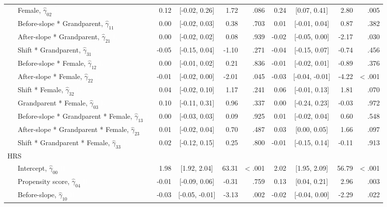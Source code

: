\documentclass[
  english,
  man,floatsintext]{apa7}
\newenvironment{lltable}{\begin{landscape}\begin{center}\begin{ThreePartTable}}{\end{ThreePartTable}\end{center}\end{landscape}}
\begin{document}
\begin{lltable}
{\begin{longtable}{lrcrrrcrr}
\ \ \ Female, $\hat{\gamma}_{02}$ \textcolor{white}{L} & 0.12 & {}[-0.02, 0.26] & 1.72 & .086 & 0.24 & {}[0.07, 0.41] & 2.80 & .005\\
\ \ \ Before-slope * Grandparent, $\hat{\gamma}_{11}$ \textcolor{white}{L} & 0.00 & {}[-0.02, 0.03] & 0.38 & .703 & 0.01 & {}[-0.01, 0.04] & 0.87 & .382\\
\ \ \ After-slope * Grandparent, $\hat{\gamma}_{21}$ \textcolor{white}{L} & 0.00 & {}[-0.02, 0.02] & 0.08 & .939 & -0.02 & {}[-0.05, 0.00] & -2.17 & .030\\
\ \ \ Shift * Grandparent, $\hat{\gamma}_{31}$ \textcolor{white}{L} & -0.05 & {}[-0.15, 0.04] & -1.10 & .271 & -0.04 & {}[-0.15, 0.07] & -0.74 & .456\\
\ \ \ Before-slope * Female, $\hat{\gamma}_{12}$ \textcolor{white}{L} & 0.00 & {}[-0.01, 0.02] & 0.21 & .836 & -0.01 & {}[-0.02, 0.01] & -0.89 & .376\\
\ \ \ After-slope * Female, $\hat{\gamma}_{22}$ \textcolor{white}{L} & -0.01 & {}[-0.02, 0.00] & -2.01 & .045 & -0.03 & {}[-0.04, -0.01] & -4.22 & < .001\\
\ \ \ Shift * Female, $\hat{\gamma}_{32}$ \textcolor{white}{L} & 0.04 & {}[-0.02, 0.10] & 1.17 & .241 & 0.06 & {}[-0.01, 0.13] & 1.81 & .070\\
\ \ \ Grandparent * Female, $\hat{\gamma}_{03}$ \textcolor{white}{L} & 0.10 & {}[-0.11, 0.31] & 0.96 & .337 & 0.00 & {}[-0.24, 0.23] & -0.03 & .972\\
\ \ \ Before-slope * Grandparent * Female, $\hat{\gamma}_{13}$ \textcolor{white}{L} & 0.00 & {}[-0.03, 0.03] & 0.09 & .925 & 0.01 & {}[-0.02, 0.04] & 0.60 & .548\\
\ \ \ After-slope * Grandparent * Female, $\hat{\gamma}_{23}$ \textcolor{white}{L} & 0.01 & {}[-0.02, 0.04] & 0.70 & .487 & 0.03 & {}[0.00, 0.05] & 1.66 & .097\\
\ \ \ Shift * Grandparent * Female, $\hat{\gamma}_{33}$ \textcolor{white}{L} & 0.02 & {}[-0.12, 0.15] & 0.25 & .800 & -0.01 & {}[-0.15, 0.14] & -0.11 & .913\\
HRS &  &  &  &  &  &  &  & \\
\ \ \ Intercept, $\hat{\gamma}_{00}$ \textcolor{white}{H} & 1.98 & {}[1.92, 2.04] & 63.31 & < .001 & 2.02 & {}[1.95, 2.09] & 56.79 & < .001\\
\ \ \ Propensity score, $\hat{\gamma}_{04}$ \textcolor{white}{H} & -0.01 & {}[-0.09, 0.06] & -0.31 & .759 & 0.13 & {}[0.04, 0.21] & 2.96 & .003\\
\ \ \ Before-slope, $\hat{\gamma}_{10}$ \textcolor{white}{H} & -0.03 & {}[-0.05, -0.01] & -3.13 & .002 & -0.02 & {}[-0.04, 0.00] & -2.29 & .022\\

\end{longtable}}
\end{lltable}
\end{document}
